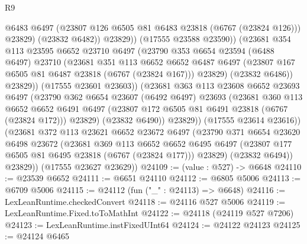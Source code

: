 \begin{lexlean}{R9}
\begin{coremodule}
{{{{{{{{{{{{{{{{{{{{{{{{{{{{{{{{{{{{{{{{{{{{{{{{{{{{{{{{{{{{{{{{{{{{{{{{{{{{{{{{{{{{                          @6483
                          @6497
                          (@23807 @126 @6505 @81 @6483 @23818 (@6767 (@23824 @126)))
                          @23829)
                        (@23832 @6482))
                      @23829))
                  (@17555 @23588 @23590))
                (@23681
                  @354
                  @113
                  @23595
                  @6652
                  @23710
                  @6497
                  (@23790
                    @353
                    @6654
                    @23594
                    (@6488 @6497)
                    @23710
                    (@23681
                      @351
                      @113
                      @6652
                      @6652
                      @6487
                      @6497
                      (@23807 @167 @6505 @81 @6487 @23818 (@6767 (@23824 @167)))
                      @23829)
                    (@23832 @6486))
                  @23829))
              (@17555 @23601 @23603))
            (@23681
              @363
              @113
              @23608
              @6652
              @23693
              @6497
              (@23790
                @362
                @6654
                @23607
                (@6492 @6497)
                @23693
                (@23681
                  @360
                  @113
                  @6652
                  @6652
                  @6491
                  @6497
                  (@23807 @172 @6505 @81 @6491 @23818 (@6767 (@23824 @172)))
                  @23829)
                (@23832 @6490))
              @23829))
          (@17555 @23614 @23616))
        (@23681
          @372
          @113
          @23621
          @6652
          @23672
          @6497
          (@23790
            @371
            @6654
            @23620
            @6498
            @23672
            (@23681
              @369
              @113
              @6652
              @6652
              @6495
              @6497
              (@23807 @177 @6505 @81 @6495 @23818 (@6767 (@23824 @177)))
              @23829)
            (@23832 @6494))
          @23829))
      (@17555 @23627 @23629))
@24109 := (value : @527) -> @6648
@24110 := @23539 @6652
@24111 := @6651 @24110
@24112 := @6805 @5006
@24113 := @6709 @5006
@24115 := @24112 (fun ("_" : @24113) => @6648)
@24116 := LexLeanRuntime.checkedConvert
@24118 := @24116 @527 @5006
@24119 := LexLeanRuntime.Fixed.toToMathInt
@24122 := @24118 (@24119 @527 @7206)
@24123 := LexLeanRuntime.instFixedUInt64
@24124 := @24122 @24123
@24125 := @24124 @6465
}}}}}}}}}}}}}}}}}}}}}}}}}}}}}}}}}}}}}}}}}}}}}}}}}}}}}}}}}}}}}}}}}}}}}}}}}}}}}}}}}}}}
\end{coremodule}
\end{lexlean}
